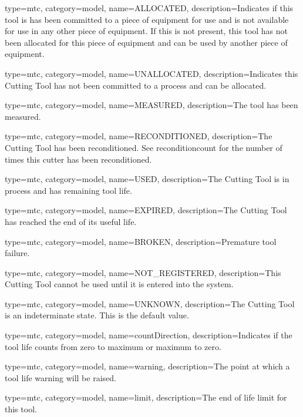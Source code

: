 {
  type=mtc,
  category=model,
  name={ALLOCATED},
  description={Indicates if this tool is has been committed to a piece of equipment for use and is not available for use in any other piece of equipment. If this is not present, this tool has not been allocated for this piece of equipment and can be used by another piece of equipment.}
}


{
  type=mtc,
  category=model,
  name={UNALLOCATED},
  description={Indicates this Cutting Tool has not been committed to a process and can be allocated.}
}


{
  type=mtc,
  category=model,
  name={MEASURED},
  description={The tool has been measured.}
}


{
  type=mtc,
  category=model,
  name={RECONDITIONED},
  description={The Cutting Tool has been reconditioned. See \gls{reconditioncount} for the number of times this cutter has been reconditioned.}
}


{
  type=mtc,
  category=model,
  name={USED},
  description={The Cutting Tool is in process and has remaining tool life.}
}


{
  type=mtc,
  category=model,
  name={EXPIRED},
  description={The Cutting Tool has reached the end of its useful life.}
}


{
  type=mtc,
  category=model,
  name={BROKEN},
  description={Premature tool failure.}
}


{
  type=mtc,
  category=model,
  name={NOT\_REGISTERED},
  description={This Cutting Tool cannot be used until it is entered into the system.}
}


{
  type=mtc,
  category=model,
  name={UNKNOWN},
  description={The Cutting Tool is an indeterminate state. This is the default value.}
}


{
  type=mtc,
  category=model,
  name={countDirection},
  description={Indicates if the tool life counts from zero to maximum or maximum to zero.}
}


{
  type=mtc,
  category=model,
  name={warning},
  description={The point at which a tool life warning will be raised.}
}


{
  type=mtc,
  category=model,
  name={limit},
  description={The end of life limit for this tool.}
}


